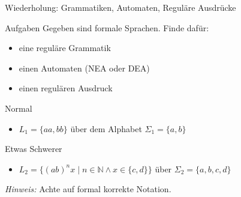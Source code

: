 %
%
%
%


{
\begin{frame}{Wiederholung: Grammatiken, Automaten, Reguläre Ausdrücke}
    \begin{alertblock}{Aufgaben}
        Gegeben sind formale Sprachen. Finde dafür:
        \vspace{-0.3cm}
        \begin{itemize}
            \item eine reguläre Grammatik
            \item einen Automaten (NEA oder DEA)
            \item einen regulären Ausdruck
        \end{itemize}
    \end{alertblock}
    \begin{block}{Normal}
        \begin{itemize}
            \item $L_1 = \{aa, bb\}$ über dem Alphabet $\Sigma_1 = \{a, b\}$
        \end{itemize}
    \end{block}
    \begin{block}{Etwas Schwerer}
        \begin{itemize}
            \item $L_2 = \{(ab)^nx \mid n \in \mathbb{N} \land x \in \{c,d\}\}$ über $\Sigma_2 = \{a,b,c,d\}$
        \end{itemize}
    \end{block}
    \textit{Hinweis:} Achte auf formal korrekte Notation.
\end{frame}
}

